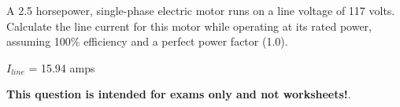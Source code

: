 

A 2.5 horsepower, single-phase electric motor runs on a line voltage of 117 volts.  Calculate the line current for this motor while operating at its rated power, assuming 100\% efficiency and a perfect power factor (1.0).







$I_{line}$ = 15.94 amps







{\bf This question is intended for exams only and not worksheets!}.


